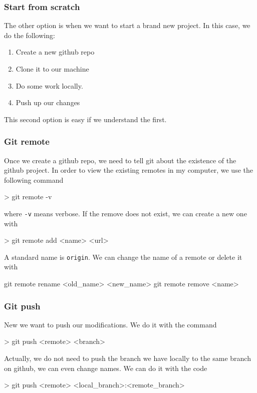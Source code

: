 \subsubsection{Start from scratch} The other option is when we want to start a brand new project.
In this case, we do the following:
\begin{enumerate}
    \item Create a new github repo
    \item Clone it to our machine
    \item Do some work locally.
    \item Push up our changes
\end{enumerate}
This second option is easy if we understand the first. 

\subsubsection{Git remote}

Once we create a github repo, we need to tell git about the existence of the github project.
In order to view the existing remotes in my computer, we use the following command
\begin{listing}{1}
> git remote -v 
\end{listing}
where \verb|-v| means verbose. If the remove does not exist, we can create a new one with
\begin{listing}{1}
> git remote add <name> <url>    
\end{listing}
A standard name is \verb|origin|. We can change the name of a remote or delete it with 
\begin{listing}{1}
git remote rename <old_name> <new_name>
git remote remove <name>
\end{listing}

\subsubsection{Git push}

New we want to push our modifications. We do it with the command
\begin{listing}{1}
> git push <remote> <branch>
\end{listing}

Actually, we do not need to push the branch we have locally to the same branch on github, we can 
even change names. We can do it with the code
\begin{listing}{1}
> git push <remote> <local_branch>:<remote_branch>
\end{listing}

